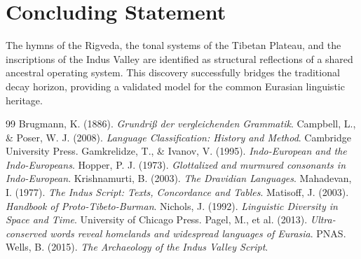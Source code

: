 \section{Concluding Statement}
The hymns of the Rigveda, the tonal systems of the Tibetan Plateau, and the inscriptions of the Indus Valley are identified as structural reflections of a shared ancestral operating system. This discovery successfully bridges the traditional decay horizon, providing a validated model for the common Eurasian linguistic heritage.

\begin{thebibliography}{99}
\small
{} Brugmann, K. (1886). \textit{Grundriß der vergleichenden Grammatik}.
 Campbell, L., \& Poser, W. J. (2008). \textit{Language Classification: History and Method}. Cambridge University Press.
 Gamkrelidze, T., \& Ivanov, V. (1995). \textit{Indo-European and the Indo-Europeans}.
 Hopper, P. J. (1973). \textit{Glottalized and murmured consonants in Indo-European}.
 Krishnamurti, B. (2003). \textit{The Dravidian Languages}.
 Mahadevan, I. (1977). \textit{The Indus Script: Texts, Concordance and Tables}.
 Matisoff, J. (2003). \textit{Handbook of Proto-Tibeto-Burman}.
 Nichols, J. (1992). \textit{Linguistic Diversity in Space and Time}. University of Chicago Press.
 Pagel, M., et al. (2013). \textit{Ultra-conserved words reveal homelands and widespread languages of Eurasia}. PNAS.
 Wells, B. (2015). \textit{The Archaeology of the Indus Valley Script}.
\end{thebibliography}

